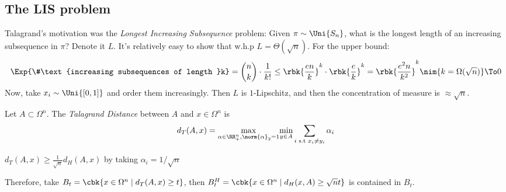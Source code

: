 \documentclass[a4paper, 11pt, oneside]{book}
\begin{document}
	\subsection{The LIS problem}
	Talagrand's motivation was the \emph{Longest Increasing Subsequence} problem: Given $\pi\sim \Uni{S_n}$, what is the longest length of an increasing subsequence in $\pi$? Denote it $L$. It's relatively easy to show that w.h.p $L = \Theta(\sqrt{n})$. For the upper bound:
	\begin{align*}
		\Exp{\#\text{increasing subsequences of length }k} = {n\choose k}\cdot\frac{1}{k!}\leq \rbk{\frac{en}{k}}^k\cdot\rbk{\frac{e}{k}}^k = \rbk{\frac{e^2n}{k^2}}^k\nim{k = \Omega(\sqrt{n})}\To 0
	\end{align*}
	Now, take $x_i\sim \Uni{[0,1]}$ and order them increasingly. Then $L$ is $1$-Lipschitz, and then the concentration of measure is $\approx \sqrt{n}$. 
	\begin{yellowBox}
	\begin{defn}
		Let $A\subset \Omega^n$. The \emph{Talagrand Distance} between $A$ and $x\in \Omega^n$ is
		\[
		d_T(A,x) = \underset{\alpha\in \RR^n_+, \norm{\alpha}_2 = 1}{\max} \underset{y\in A}{\min} \sum_{i \text{ s.t }x_i\neq y_i}\alpha_i
		\]
	\end{defn}	
	\begin{remark}
		$d_T(A,x) \ge \frac{1}{\sqrt{n}}d_H(A,x)$ by taking $\alpha_i = 1/\sqrt{n}$
	\end{remark}
	\end{yellowBox}
	Therefore, take $B_t = \cbk{x\in \Omega^n \mid d_T(A,x)\ge t}$, then $B^H_t = \cbk{x\in \Omega^n\mid d_H(x,A) \ge \sqrt{n}t}$ is contained in $B_t$.
\end{document}
